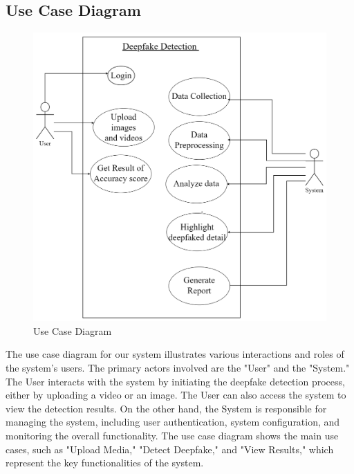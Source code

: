 
\subsection{Use Case Diagram}
\begin{figure}[h]
    \centering
    \includegraphics[width= 5.5in ]{img/usecasediagram.drawio.png}
    \caption{{Use Case Diagram}}
\end{figure}
\justify
The use case diagram for our system illustrates various interactions and roles of the system's users. The primary actors involved are the "User" and the "System." The User interacts with the system by initiating the deepfake detection process, either by uploading a video or an image. The User can also access the system to view the detection results. On the other hand, the System is responsible for managing the system, including user authentication, system configuration, and monitoring the overall functionality. The use case diagram shows the main use cases, such as "Upload Media," "Detect Deepfake," and "View Results," which represent the key functionalities of the system.